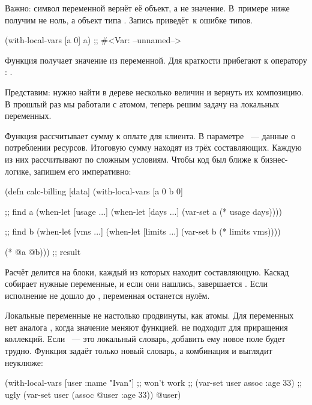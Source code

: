 Важно: символ переменной вернёт её объект, а не значение. В~примере ниже получим
не ноль, а объект типа . Запись  приведёт~к ошибке
типов.

\begin{clojure}
(with-local-vars [a 0] a)
;; #<Var: --unnamed-->
\end{clojure}

Функция  получает значение из переменной. Для краткости
прибегают к оператору : .

Представим: нужно найти в дереве несколько величин и вернуть их композицию. В
прошлый раз мы работали с атомом, теперь решим задачу на локальных переменных.

Функция  рассчитывает сумму к оплате для клиента. В параметре
~--- данные о потреблении ресурсов. Итоговую сумму находят из трёх
составляющих. Каждую из них рассчитывают по сложным условиям. Чтобы код был
ближе к бизнес-логике, запишем его императивно:

\begin{clojure}
(defn calc-billing [data]
  (with-local-vars [a 0 b 0]

    ;; find a
    (when-let [usage ...]
      (when-let [days ...]
        (var-set a (* usage days))))

    ;; find b
    (when-let [vms ...]
      (when-let [limits ...]
        (var-set b (* limits vms))))

    (* @a @b))) ;; result
\end{clojure}

Расчёт делится на блоки, каждый из которых находит составляющую. Каскад
 собирает нужные переменные, и если они нашлись, завершается
. Если исполнение не дошло до , переменная останется
нулём.

Локальные переменные не настолько продвинуты, как атомы. Для переменных нет
аналога , когда значение меняют функцией.  не
подходит для приращения коллекций. Если ~--- это локальный словарь,
добавить ему новое поле будет трудно. Функция  задаёт только новый
словарь, а комбинация  и  выглядит неуклюже:

\ifnarrow

\begin{clojure}
(with-local-vars [user {:name "Ivan"}]
  ;; won't work
  ;; (var-set user assoc :age 33)
  ;; ugly
  (var-set user (assoc @user :age 33))
  @user)
\end{clojure}

